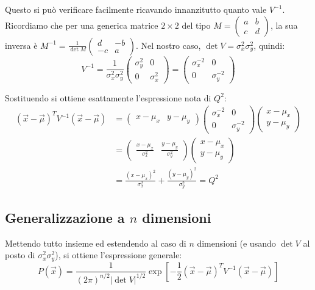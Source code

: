 \documentclass[openany,a4paper,12pt]{book}
\theoremstyle{remark}
\begin{document}
Questo si può verificare facilmente ricavando innanzitutto quanto vale $V^{-1}$. Ricordiamo che per una generica matrice $2 \times 2$ del tipo $M = \begin{pmatrix} a & b \\ c & d \end{pmatrix}$, la sua inversa è $M^{-1} = \frac{1}{\det M} \begin{pmatrix} d & -b \\ -c & a \end{pmatrix}$. 
Nel nostro caso, $\det V = \sigma_x^2 \sigma_y^2$, quindi:
\begin{equation}
V^{-1} = \frac{1}{\sigma_x^2\sigma_y^2} \begin{pmatrix} \sigma_y^2 & 0 \\ 0 & \sigma_x^2 \end{pmatrix} = \begin{pmatrix} \sigma_x^{-2} & 0 \\ 0 & \sigma_y^{-2} \end{pmatrix}
\end{equation}

Sostituendo si ottiene esattamente l'espressione nota di $Q^2$:
\begin{align*}
(\vec{x} - \vec{\mu})^T V^{-1} (\vec{x} - \vec{\mu}) &= \begin{pmatrix} x-\mu_x & y-\mu_y \end{pmatrix} \begin{pmatrix} \sigma_x^{-2} & 0 \\ 0 & \sigma_y^{-2} \end{pmatrix} \begin{pmatrix} x-\mu_x \\ y-\mu_y \end{pmatrix} \\
&= \begin{pmatrix} \frac{x-\mu_x}{\sigma_x^2} & \frac{y-\mu_y}{\sigma_y^2} \end{pmatrix} \begin{pmatrix} x-\mu_x \\ y-\mu_y \end{pmatrix} \\
&= \frac{(x-\mu_x)^2}{\sigma_x^2} + \frac{(y-\mu_y)^2}{\sigma_y^2} = Q^2
\end{align*}

\subsection*{Generalizzazione a $n$ dimensioni}
Mettendo tutto insieme ed estendendo al caso di $n$ dimensioni (e usando $\det V$ al posto di $\sigma_x^2\sigma_y^2$), si ottiene l'espressione generale:
\begin{equation}
P(\vec{x}) = \frac{1}{(2\pi)^{n/2} |\det V|^{1/2}} \exp\left[ -\frac{1}{2}(\vec{x}-\vec{\mu})^T V^{-1} (\vec{x}-\vec{\mu}) \right]
\end{equation}
\end{document}
